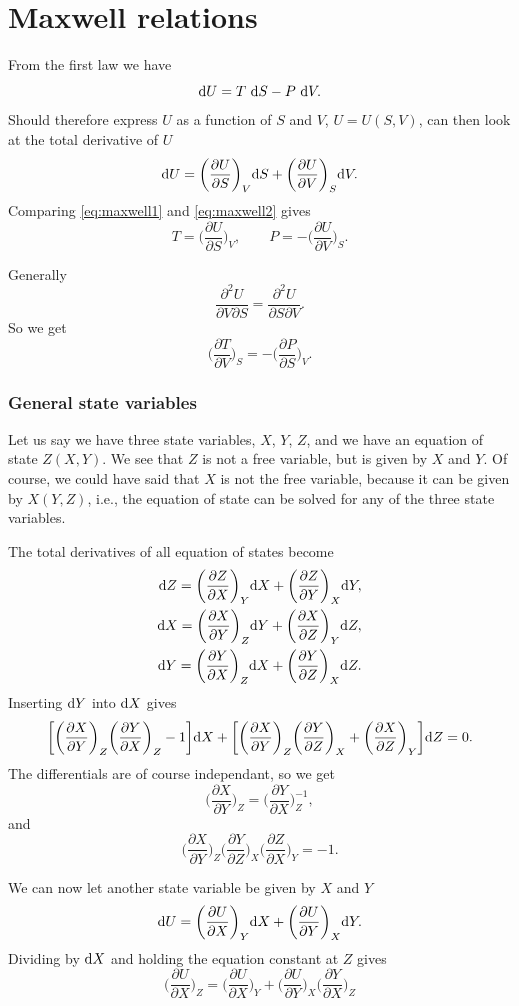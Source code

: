 \documentclass[a4paper, 11pt, notitlepage, english]{article}
\newcommand{\beq}{\begin{equation}}
\newcommand{\eeq}{\end{equation}}
\renewcommand{\d}{{\rm d}}
\renewcommand{\b}{\bigg}
\newcommand{\p}{\partial}
\begin{document}
\clearpage

\section*{Maxwell relations}
From the first law we have
\beq \d U = T\ \d S - P\ \d V. \eeq \label{eq:maxwell1}
Should therefore express $U$ as a function of $S$ and $V$, $U = U(S,V)$, can then look at the total derivative of $U$
\beq \d U = \bigg(\frac{\p U}{\p S}\bigg)_V \d S + \bigg(\frac{\p U}{\p V}\bigg)_S \d V. \eeq \label{eq:maxwell2}
Comparing \ref{eq:maxwell1} and \ref{eq:maxwell2} gives
$$T = \bigg(\frac{\p U}{\p S}\bigg)_V, \qquad P = -\bigg(\frac{\p U}{\p V}\bigg)_S.$$

Generally
$$\frac{\p^2 U}{\p V \p S} = \frac{\p^2 U}{\p S \p V}.$$
So we get
$$\bigg(\frac{\p T}{\p V}\bigg)_S = -\bigg(\frac{\p P}{\p S}\bigg)_V.$$

\subsubsection*{General state variables}
Let us say we have three state variables, $X$, $Y$, $Z$, and we have an equation of state $Z(X,Y)$. We see that $Z$ is not a free variable, but is given by $X$ and $Y$. Of course, we could have said that $X$ is not the free variable, because it can be given by $X(Y,Z)$, i.e., the equation of state can be solved for any of the three state variables.

The total derivatives of all equation of states become
\begin{align*}
\d Z = \bigg(\frac{\p Z}{\p X}\bigg)_Y \d X + \bigg(\frac{\p Z}{\p Y}\bigg)_X \d Y, \\
\d X = \bigg(\frac{\p X}{\p Y}\bigg)_Z \d Y + \bigg(\frac{\p X}{\p Z}\bigg)_Y \d Z, \\
\d Y = \bigg(\frac{\p Y}{\p X}\bigg)_Z \d X + \bigg(\frac{\p Y}{\p Z}\bigg)_X \d Z.
\end{align*}
Inserting $\d Y$ into $\d X$ gives
$$\bigg[\bigg(\frac{\p X}{\p Y}\bigg)_Z\bigg(\frac{\p Y}{\p X}\bigg)_Z - 1\bigg]\d X  + \bigg[\bigg(\frac{\p X}{\p Y}\bigg)_Z\bigg(\frac{\p Y}{\p Z}\bigg)_X + \bigg(\frac{\p X}{\p Z}\bigg)_Y\bigg]\d Z = 0.$$
The differentials are of course independant, so we get
$$\bigg(\frac{\p X}{\p Y}\bigg)_Z = \bigg(\frac{\p Y}{\p X}\bigg)_Z^{-1},$$
and
$$\bigg(\frac{\p X}{\p Y}\bigg)_Z \bigg(\frac{\p Y}{\p Z}\bigg)_X \bigg(\frac{\p Z}{\p X}\bigg)_Y = -1.$$

We can now let another state variable be given by $X$ and $Y$
$$\d U = \bigg(\frac{\p U}{\p X}\bigg)_Y \d X + \bigg(\frac{\p U}{\p Y}\bigg)_X \d Y.$$
Dividing by $\d X$ and holding the equation constant at $Z$ gives
$$\b( \frac{\p U}{\p X} \b)_Z = \bigg(\frac{\p U}{\p X}\b)_Y + \b(\frac{\p U}{\p Y}\b)_X \b(\frac{\p Y}{\p X}\b)_Z$$
\end{document}
